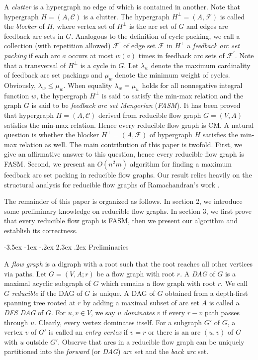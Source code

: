\documentclass[11pt]{article}
\makeatletter
\renewcommand\section{%
  \@startsection{section}{1}
                {\z@}%
                {-3.5ex \@plus -1ex \@minus -.2ex}%
                {2.3ex \@plus.2ex}%
                {\large\bfseries}%
}
\makeatother
\begin{document}
A \emph{clutter} is a hypergraph no edge of which is contained in another. Note that hypergraph $H=(A,\mathcal{C})$ is a clutter. The hypergraph $H^\perp=(A,\mathcal{F})$ is called the \emph{blocker} of $H$, where vertex set of $H^\perp$ is the arc set of $G$ and edges are feedback arc sets in $G$. Analogous to the definition of cycle packing, we call a collection (with repetition allowed) $\mathcal{F}^\prime$ of edge set $\mathcal{F}$ in $H^\perp$ a \emph{feedback arc set packing} if each arc $a$ occurs at most $w(a)$ times in feedback arc sets of $\mathcal{F}^\prime$. Note that a transversal of $H^\perp$ is a cycle in $G$. Let $\lambda_w$ denote the maximum cardinality of feedback arc set packings and $\mu_w$ denote the minimum weight of cycles. Obviously, $\lambda_w\leq\mu_w$. When equality $\lambda_w=\mu_w$ holds for all nonnegative integral function $w$, the hypergraph $H^\perp$ is said to satisfy the min-max relation and the graph $G$ is said to be \emph{feedback arc set Mengerian} (\emph{FASM}). It has been proved that hypergraph $H=(A,\mathcal{C})$ derived from reducible flow graph $G=(V,A)$ satisfies the min-max relation. Hence every reducible flow graph is CM. A natural question is whether the blocker $H^\perp=(A,\mathcal{F})$ of hypergraph $H$ satisfies the min-max relation as well. The main contribution of this paper is twofold. First, we give an affirmative answer to this question, hence every reducible flow graph is FASM. Second, we present an $O(n^2 m)$ algorithm for finding a maximum feedback arc set packing in reducible flow graphs. Our result relies heavily on the structural analysis for reducible flow graphs of Ramachandran's work \cite{Rama1,Rama2}.

The remainder of this paper is organized as follows. In section 2, we introduce some preliminary knowledge on reducible flow graphs. In section 3, we first prove that every reducible flow graph is FASM, then we present our algorithm and establish its correctness.

\section{Preliminaries}
\label{prel}

A \emph{flow graph} is a digraph with a root such that the root reaches all other vertices via paths.
Let $G=(V,A;r)$ be a flow graph with root $r$. 
A \emph{DAG} of $G$ is a maximal acyclic subgraph of $G$ which remains a flow graph with root $r$. We call $G$ \emph{reducible} if the DAG of $G$ is unique. A DAG of $G$ obtained from a depth-first spanning tree rooted at $r$ by adding a maximal subset of arc set $A$ is called a \emph{DFS DAG} of $G$.
For $u,v\in V$, we say $u$ \emph{dominates} $v$ if every $r-v$ path passes through $u$. Clearly, every vertex dominates itself. For a subgraph $G'$ of $G$, a vertex $v$ of $G'$ is called an \emph{entry vertex} if $v=r$ or there is an arc $(u,v)$ of $G$ with $u$ outside $G'$.  Observe that arcs in a reducible flow graph can be uniquely partitioned into the \emph{forward} (or \emph{DAG}) \emph{arc} set and the \emph{back arc} set.
\end{document}
